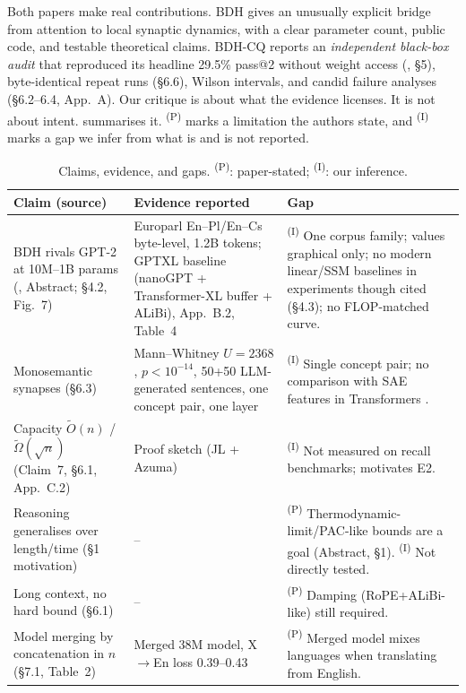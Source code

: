 \documentclass[11pt]{article}
\theoremstyle{remark}
\newcommand{\PS}{\textsuperscript{(P)}}
\newcommand{\IN}{\textsuperscript{(I)}}
\begin{document}
Both papers make real contributions. BDH gives an unusually explicit bridge from attention to local synaptic
dynamics, with a clear parameter count, public code, and testable theoretical claims. BDH-CQ reports an
\emph{independent black-box audit} that reproduced its headline 29.5\% pass@2 without weight access
(\citealp{engdahl2026bdhcq}, \S5), byte-identical repeat runs (\S6.6), Wilson intervals, and candid failure
analyses (\S6.2--6.4, App.~A). Our critique is about what the evidence licenses. It is not about intent.
 summarises it. \PS{} marks a limitation the authors state, and \IN{} marks a gap we infer from
what is and is not reported.

\begin{table}[!htbp]
\centering
\footnotesize
\caption{Claims, evidence, and gaps. \PS: paper-stated; \IN: our inference.}
\label{tab:critique}
\begin{tabularx}{\linewidth}{@{}>{\raggedright\arraybackslash}p{3.4cm}>{\raggedright\arraybackslash}X>{\raggedright\arraybackslash}X@{}}
\toprule
Claim (source) & Evidence reported & Gap \\
\midrule
BDH rivals GPT-2 at 10M--1B params (\citealp{kosowski2025bdh}, Abstract; \S4.2, Fig.~7) &
Europarl En--Pl/En--Cs byte-level, 1.2B tokens; GPTXL baseline (nanoGPT + Transformer-XL buffer + ALiBi), App.~B.2, Table~4 &
\IN{} One corpus family; values graphical only; no modern linear/SSM baselines in experiments though cited (\S4.3); no FLOP-matched curve.\\
Monosemantic synapses (\S6.3) & Mann--Whitney $U=2368$, $p<10^{-14}$, 50+50 LLM-generated sentences, one concept pair, one layer &
\IN{} Single concept pair; no comparison with SAE features in Transformers \citep{bricken2023monosemanticity}.\\
Capacity $\tilde O(n)$ / $\tilde\Omega(\sqrt n)$ (Claim~7, \S6.1, App.~C.2) & Proof sketch (JL + Azuma) &
\IN{} Not measured on recall benchmarks; motivates E2.\\
Reasoning generalises over length/time (\S1 motivation) & -- &
\PS{} Thermodynamic-limit/PAC-like bounds are a goal (Abstract, \S1). \IN{} Not directly tested.\\
Long context, no hard bound (\S6.1) & -- & \PS{} Damping (RoPE+ALiBi-like) still required.\\
Model merging by concatenation in $n$ (\S7.1, Table~2) & Merged 38M model, X$\to$En loss 0.39--0.43 &
\PS{} Merged model mixes languages when translating from English.\\

\end{tabularx}
\end{table}
\end{document}
